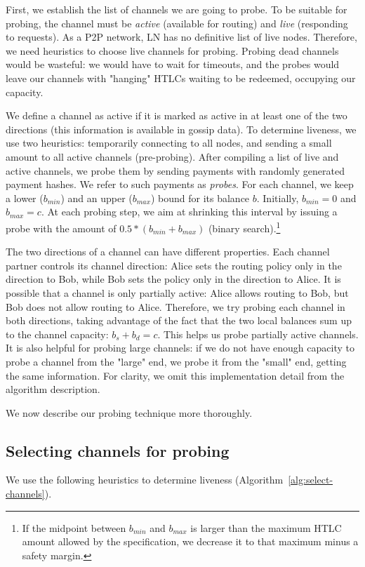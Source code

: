 First, we establish the list of channels we are going to probe.
To be suitable for probing, the channel must be \textit{active} (available for routing) and \textit{live} (responding to requests).
As a P2P network, LN has no definitive list of live nodes.
Therefore, we need heuristics to choose live channels for probing. 
Probing dead channels would be wasteful: we would have to wait for timeouts, and the probes would leave our channels with "hanging" HTLCs waiting to be redeemed, occupying our capacity.

We define a channel as active if it is marked as active in at least one of the two directions (this information is available in gossip data).
To determine liveness, we use two heuristics: temporarily connecting to all nodes, and sending a small amount to all active channels (pre-probing).
After compiling a list of live and active channels, we probe them by sending payments with randomly generated payment hashes.
We refer to such payments as \textit{probes}.
For each channel, we keep a lower ($b_{min}$) and an upper ($b_{max}$) bound for its balance $b$.
Initially, $b_{min}=0$ and $b_{max}=c$.
At each probing step, we aim at shrinking this interval by issuing a probe with the amount of $0.5 * (b_{min} + b_{max})$ (binary search).\footnote{If the midpoint between $b_{min}$ and $b_{max}$ is larger than the maximum HTLC amount allowed by the specification, we decrease it to that maximum minus a safety margin.}

The two directions of a channel can have different properties.
Each channel partner controls its channel direction: Alice sets the routing policy only in the direction to Bob, while Bob sets the policy only in the direction to Alice.
It is possible that a channel is only partially active: Alice allows routing to Bob, but Bob does not allow routing to Alice.
Therefore, we try probing each channel in both directions, taking advantage of the fact that the two local balances sum up to the channel capacity: $b_s + b_d = c$.
This helps us probe partially active channels.
It is also helpful for probing large channels: if we do not have enough capacity to probe a channel from the "large" end, we probe it from the "small" end, getting the same information.
For clarity, we omit this implementation detail from the algorithm description.

We now describe our probing technique more thoroughly.

\subsection{Selecting channels for probing}
We use the following heuristics to determine liveness (Algorithm~\ref{alg:select-channels}).

